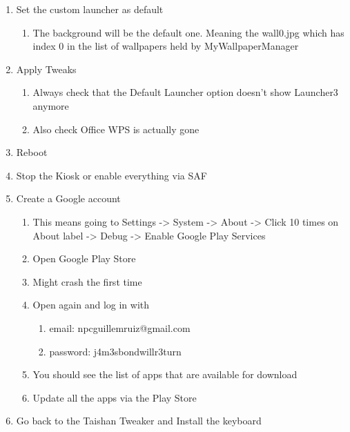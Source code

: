 \begin{enumerate}
\begin{enumerate}
            \item{The background will turn white.\footnote{\label{background-white} I've noticed that sometimes it doesn't and goes straight to the default one}}
        \end{enumerate}
    \item Set the custom launcher as default
        \begin{enumerate}
            \item The \faImage background will be the default one. Meaning the wall0.jpg which has index 0 in the list of wallpapers held by MyWallpaperManager
        \end{enumerate}
    \item Apply Tweaks
        \begin{enumerate}
            \item Always check that the Default Launcher option doesn't show Launcher3 anymore
            \item Also check Office WPS is actually gone
        \end{enumerate}
    \item Reboot
    \item Stop the Kiosk or enable everything via SAF
    \item Create a Google account
    \begin{enumerate}
        \item{This means going to Settings -> System -> About -> Click 10 times on About label -> Debug -> Enable Google Play Services}
        \item Open Google Play Store \faGooglePlay
        \item Might crash the first time
        \item Open again and log in with
        \begin{enumerate}
            \item{email: npcguillemruiz@gmail.com}
            \item{password: j4m3sbondwillr3turn}
        \end{enumerate}
        \item You should see the list of apps that are available for download
        \item {\color{BrickRed}\faWrench} Update all the apps via the Play Store
    \end{enumerate}
    \item Go back to the Taishan Tweaker and Install the keyboard\faKeyboard
    \begin{enumerate}

\end{enumerate}
\end{enumerate}
